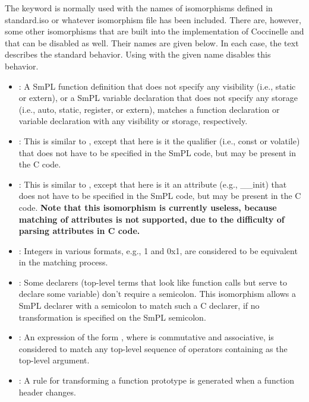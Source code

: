 The keyword  is normally used with the names of
isomorphisms defined in standard.iso or whatever isomorphism file has been
included.  There are, however, some other isomorphisms that are built into
the implementation of Coccinelle and that can be disabled as well.  Their
names are given below.  In each case, the text describes the standard
behavior.  Using  with the given name disables this behavior.

\begin{itemize}
\item {}: A SmPL function definition that does not
  specify any visibility (i.e., static or extern), or a SmPL variable
  declaration that does not specify any storage (i.e., auto, static,
  register, or extern), matches a function declaration or variable
  declaration with any visibility or storage, respectively.
\item {}: This is similar to ,
  except that here is it the qualifier (i.e., const or volatile) that does
  not have to be specified in the SmPL code, but may be present in the C code.
\item {}: This is similar to
  , except that here is it an attribute (e.g.,
  \_\_init) that does not have to be specified in the SmPL code, but may be
  present in the C code.  \textbf{Note that this isomorphism is currently
    useless, because matching of attributes is not supported, due to the
    difficulty of parsing attributes in C code.}
\item {}: Integers in various formats, e.g., 1 and 0x1, are
  considered to be equivalent in the matching process.
\item {}: Some declarers (top-level terms
  that look like function calls but serve to declare some variable) don't
  require a semicolon.  This isomorphism allows a SmPL declarer with a semicolon
  to match such a C declarer, if no transformation is specified on the SmPL
  semicolon.
\item {}: An expression of the form  
  , where  is commutative and associative, is
  considered to match any top-level sequence of  operators
  containing  as the top-level argument.
\item {}: A rule for transforming a function prototype is
  generated when a function header changes.
\end{itemize}

